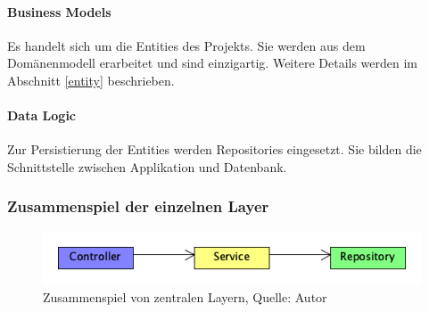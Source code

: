 \paragraph{Business Models}
Es handelt sich um die Entities des Projekts. Sie werden aus dem Domänenmodell erarbeitet und sind einzigartig. Weitere Details werden im Abschnitt \ref{entity} beschrieben. 

\paragraph{Data Logic}
Zur Persistierung der Entities werden Repositories eingesetzt. Sie bilden die Schnittstelle zwischen Applikation und Datenbank. 

\subsubsection{Zusammenspiel der einzelnen Layer}
\begin{figure}[H]
	\centering
	\includegraphics[width=\linewidth]{images/springFlow.png}
	\caption[Zusammenspiel von zentralen Layern]{Zusammenspiel von zentralen Layern, Quelle: Autor}
	\label{img: layer}
\end{figure}

